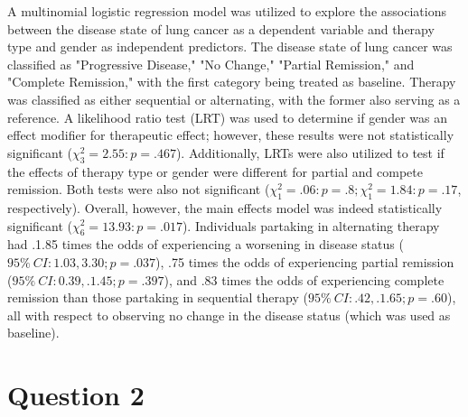 \documentclass{article}
\begin{document}
A multinomial logistic regression model was utilized to explore the associations between the disease state of lung cancer as a dependent variable and therapy type and gender as independent predictors. The disease state of lung cancer was classified as "Progressive Disease," "No Change," "Partial Remission," and "Complete Remission," with the first category being treated as baseline. Therapy was classified as either sequential or alternating, with the former also serving as a reference. A likelihood ratio test (LRT) was used to determine if gender was an effect modifier for therapeutic effect; however, these results were not statistically significant ($\chi^2_3 = 2.55: p=.467$). Additionally, LRTs were also utilized to test if the effects of therapy type or gender were different for partial and compete remission. Both tests were also not significant ($\chi^2_1 = .06: p=.8; \chi^2_1 = 1.84: p=.17$, respectively). Overall, however, the main effects model was indeed statistically significant ($\chi^2_6 = 13.93: p=.017$). Individuals partaking in alternating therapy had .1.85 times the odds of experiencing a worsening in disease status ($95 \%\ CI: 1.03, 3.30; p = .037$), .75 times the odds of experiencing partial remission ($95 \%\ CI: 0.39, .1.45; p = .397$), and .83 times the odds of experiencing complete remission than those partaking in sequential therapy ($95 \%\ CI: .42, .1.65; p = .60$), all with respect to observing no change in the disease status (which was used as baseline).    


\section{Question 2}
\end{document}
